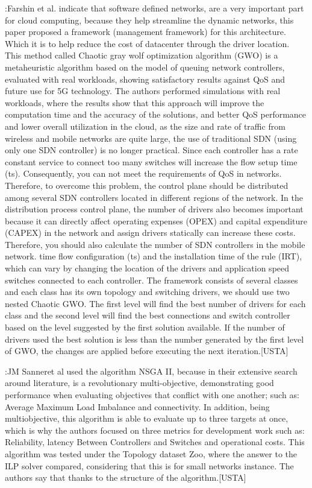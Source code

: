 \documentclass[a4paper,10pt]{article}
\begin{document}
\cite{FaSh17}:Farshin et al. indicate that software defined networks, are a very important part for cloud computing, because they help streamline the dynamic networks, this paper proposed a framework (management framework) for this architecture. Which it is to help reduce the cost of datacenter through the driver location. This method called Chaotic gray wolf optimization algorithm (GWO) is a metaheuristic algorithm based on the model of queuing network controllers, evaluated with real workloads, showing satisfactory results against QoS and future use for 5G technology.
The authors performed simulations with real workloads, where the results show that this approach will improve the computation time and the accuracy of the solutions, and better QoS performance and lower overall utilization in the cloud, as the size and rate of traffic from wireless and mobile networks are quite large, the use of traditional SDN (using only one SDN controller) is no longer practical. Since each controller has a rate constant service to connect too many switches will increase the flow setup time (ts). Consequently, you can not meet the requirements of QoS in networks. Therefore, to overcome this problem, the control plane should be distributed among several SDN controllers located in different regions of the network. In the distribution process control plane, the number of drivers also becomes important because it can directly affect operating expenses (OPEX) and capital expenditure (CAPEX) in the network and assign drivers statically can increase these costs. Therefore, you should also calculate the number of SDN controllers in the mobile network.
time flow configuration (ts) and the installation time of the rule (IRT), which can vary by changing the location of the drivers and application speed switches connected to each controller. The framework consists of several classes and each class has its own topology and switching drivers, we should use two nested Chaotic GWO. The first level will find the best number of drivers for each class and the second level will find the best connections and switch controller based on the level suggested by the first solution available. If the number of drivers used the best solution is less than the number generated by the first level of GWO, the changes are applied before executing the next iteration.[USTA]



\cite{LiYo16}:JM Sanneret al used the algorithm NSGA II, because in their extensive search around literature, is a revolutionary multi-objective, demonstrating good performance when evaluating objectives that conflict with one another; such as: Average Maximum Load Imbalance and connectivity. In addition, being multiobjective, this algorithm is able to evaluate up to three targets at once, which is why the authors focused on three metrics for development work such as: Reliability, latency Between Controllers and Switches and operational costs. This algorithm was tested under the Topology dataset Zoo, where the answer to the ILP solver compared, considering that this is for small networks instance. The authors say that thanks to the structure of the algorithm.[USTA]
\end{document}
